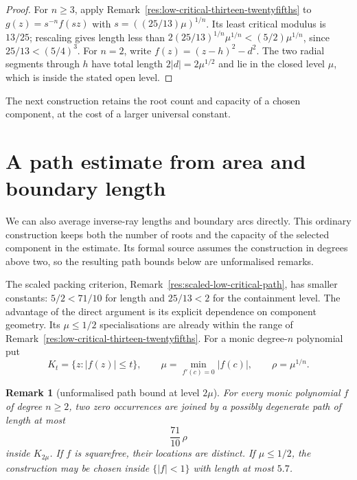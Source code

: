 \documentclass[11pt]{article}
\newtheorem{remark}[theorem]{Remark}
\begin{document}
\begin{proof}
For $n\ge3$, apply Remark~\ref{res:low-critical-thirteen-twentyfifths}
to $g(z)=s^{-n}f(sz)$ with $s=((25/13)\mu)^{1/n}$.
Its least critical modulus is $13/25$; rescaling gives length less than
$2(25/13)^{1/n}\mu^{1/n}<(5/2)\mu^{1/n}$, since
$25/13<(5/4)^3$.  For $n=2$, write $f(z)=(z-h)^2-d^2$.
The two radial segments through $h$ have total length $2|d|=2\mu^{1/2}$
and lie in the closed level $\mu$, which is inside the stated open level.
\end{proof}
The next construction retains the root count and capacity of a chosen
component, at the cost of a larger universal constant.

\section{A path estimate from area and boundary length}
\label{sec:constant-factor}

We can also average inverse-ray lengths and boundary arcs directly.
This ordinary construction keeps both the number of roots and the
capacity of the selected component in the estimate. Its formal source
assumes the construction in degrees above two, so the resulting path
bounds below are unformalised remarks.

The scaled packing criterion, Remark~\ref{res:scaled-low-critical-path},
has smaller constants: $5/2<71/10$ for length and $25/13<2$ for the
containment level. The advantage of the direct argument is its explicit
dependence on component geometry. Its $\mu\le1/2$ specialisations are
already within the range of Remark~\ref{res:low-critical-thirteen-twentyfifths}.
For a monic degree-$n$ polynomial put
\[
 K_t=\{z:|f(z)|\le t\},\qquad
 \mu=\min_{f'(c)=0}|f(c)|,\qquad \rho=\mu^{1/n}.
\]

\begin{remark}[unformalised path bound at level $2\mu$]
\label{res:constant-factor-path}
For every monic polynomial $f$ of degree $n\ge2$, two zero occurrences are
joined by a possibly degenerate path of length at most
\[
 \frac{71}{10}\,\rho
\]
inside $K_{2\mu}$.  If $f$ is squarefree, their locations are distinct.
If $\mu\le1/2$, the construction may be chosen inside $\{|f|<1\}$ with
length at most $5.7$.
\end{remark}
\end{document}
